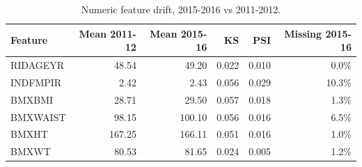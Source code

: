 \begin{table}[t]
\centering
\footnotesize
\caption{Numeric feature drift, 2015-2016 vs 2011-2012.}
\label{tab:drift}
\begin{tabular}{lrrrrr}
\toprule
Feature & Mean 2011-12 & Mean 2015-16 & KS & PSI & Missing 2015-16 \\
\midrule
RIDAGEYR & 48.54 & 49.20 & 0.022 & 0.010 & 0.0\% \\
INDFMPIR & 2.42 & 2.43 & 0.056 & 0.029 & 10.3\% \\
BMXBMI & 28.71 & 29.50 & 0.057 & 0.018 & 1.3\% \\
BMXWAIST & 98.15 & 100.10 & 0.056 & 0.016 & 6.5\% \\
BMXHT & 167.25 & 166.11 & 0.051 & 0.016 & 1.0\% \\
BMXWT & 80.53 & 81.65 & 0.024 & 0.005 & 1.2\% \\
\bottomrule
\end{tabular}
\end{table}
